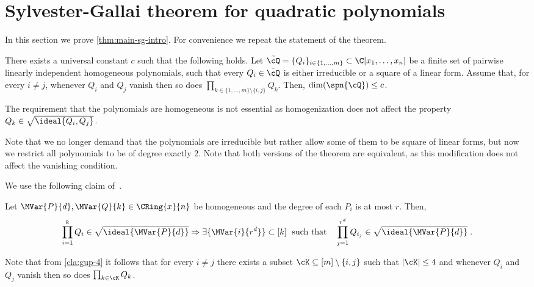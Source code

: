 \section{Sylvester-Gallai theorem for quadratic polynomials}\label{sec:quad-SG}

In this section we prove \autoref{thm:main-sg-intro}. For convenience we repeat the statement of the theorem.








\begin{theorem*}
There exists a universal constant $c$ such that the following holds. 
Let $\tilde{\cQ} = \{Q_i\}_{i\in \{1,\ldots,m\}}\subset\C[x_1,\ldots,x_n]$ be a finite set of pairwise linearly independent homogeneous polynomials, such that every $Q_i\in \tilde{\cQ}$ is either irreducible or a square of a linear form. Assume  that, for every $i\neq j$, whenever $Q_i$ and $Q_j$ vanish then so does $\prod_{k\in  \{1,\ldots,m\} \setminus\{i,j\}} Q_k$. Then,  $\dim(\spn{\cQ})\leq c$.
\end{theorem*}





\begin{remark}
The requirement that the polynomials are homogeneous is not essential as homogenization does not affect the property $Q_k\in\sqrt{\ideal{Q_i,Q_j}}$. 
\end{remark}

\begin{remark}
Note that we no longer demand that the polynomials are irreducible but rather allow some of them to be square of linear forms, but now we restrict all polynomials to be of degree exactly $2$. Note that both versions of the theorem are equivalent, as this modification does not affect the vanishing condition. 
\end{remark}

We use the following claim of~\cite{Gupta14}.
\begin{claim}\label{cla:gup-4}
Let $\MVar{P}{d},\MVar{Q}{k}\in \CRing{x}{n}$ be homogeneous and the degree of each $P_i$ is at most $r$. Then,
\begin{equation*}
\prod_{i=1}^k Q_i \in \sqrt{\ideal{\MVar{P}{d}}} \Rightarrow \exists \lbrace \MVar{i}{r^d} \rbrace \subset [k] \; \text{ such that} \quad  \prod_{j=1}^{r^d} Q_{i_j} \in \sqrt{\ideal{\MVar{P}{d}}} \;.
\end{equation*}
\end{claim}
\begin{remark}\label{rem:K=4}
Note that from \autoref{cla:gup-4} it follows that for every $i\neq j$ there exists a subset $\cK \subseteq [m]\setminus\{i,j\}$ such that $|\cK|\leq 4$ and whenever $Q_i$ and $Q_j$ vanish then so does $\prod_{k\in \cK} Q_k$.
\end{remark}


